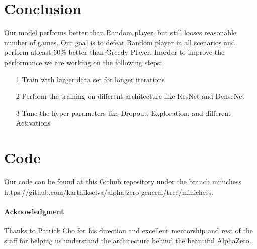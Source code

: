 \documentclass[11pt]{article}
\begin{document}
\section{Conclusion}
\label{sec:conclusion}

Our model performs better than Random player, but still looses reasonable number of games. Our goal is to defeat Random player in all scenarios and perform atleast 60\% better than Greedy Player. Inorder to improve the performance we are working on the following steps:

\begin{itemize}
	\item[1] Train with larger data set for longer iterations 
	\item[2] Perform the training on different architecture like ResNet and DenseNet 
	\item[3] Tune the hyper parameters like Dropout, Exploration, and different Activations
\end{itemize}

%
%

\section{Code}
Our code can be found at this Github repository under the branch minichess https://github.com/karthikselva/alpha-zero-general/tree/minichess.

\paragraph{Acknowledgment}

Thanks to Patrick Cho for his direction and excellent mentorship and rest of the staff for helping us understand the architecture behind the beautiful AlphaZero.
\end{document}
